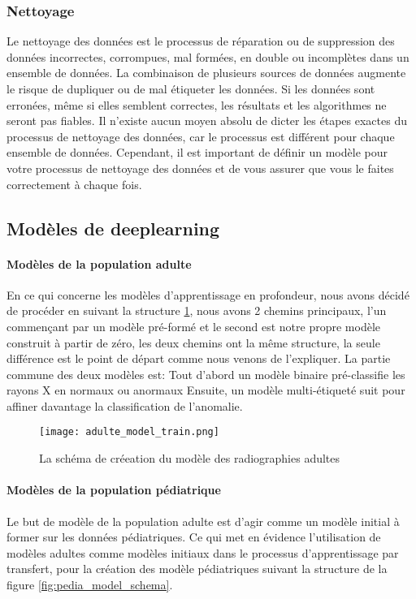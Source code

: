         \subsubsection{Nettoyage}
        Le nettoyage des données est le processus de réparation ou de suppression des données incorrectes, corrompues, mal formées, en double ou incomplètes dans un ensemble de données. La combinaison de plusieurs sources de données augmente le risque de dupliquer ou de mal étiqueter les données. Si les données sont erronées, même si elles semblent correctes, les résultats et les algorithmes ne seront pas fiables. Il n'existe aucun moyen absolu de dicter les étapes exactes du processus de nettoyage des données, car le processus est différent pour chaque ensemble de données. Cependant, il est important de définir un modèle pour votre processus de nettoyage des données et de vous assurer que vous le faites correctement à chaque fois.


   
    \subsection{Modèles de deeplearning}

    \paragraph*{Modèles de la population adulte} En ce qui concerne les modèles d'apprentissage en profondeur, nous avons décidé de procéder en suivant la structure \ref{fig:adulte_model_schema}, nous avons 2 chemins principaux, l'un commençant par un modèle pré-formé et le second est notre propre modèle construit à partir de zéro, les deux chemins ont la même structure, la seule différence est le point de départ comme nous venons de l'expliquer.
    La partie commune des deux modèles est:
    Tout d'abord un modèle binaire pré-classifie les rayons X en normaux ou anormaux
    Ensuite, un modèle multi-étiqueté suit pour affiner davantage la classification de l'anomalie.

    \begin{figure}[H]
        \centering
        \texttt{[image: adulte\_model\_train.png]}
        \caption{La schéma de créeation du modèle des radiographies adultes}\label{fig:adulte_model_schema}
    \end{figure}
    \paragraph*{Modèles de la population pédiatrique} Le but de modèle de la population adulte est d'agir comme un modèle initial à former sur les données pédiatriques.
    Ce qui met en évidence l'utilisation de modèles adultes comme modèles initiaux dans le processus d'apprentissage par transfert, pour la création des modèle pédiatriques suivant la structure de la figure \ref{fig:pedia_model_schema}.

